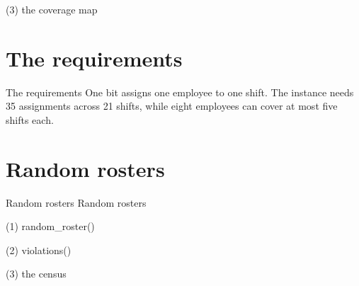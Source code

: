 \begin{frame}[fragile]{(3) the coverage map}

\end{frame}


\section{The requirements}

\begin{frame}{The requirements}
One bit assigns one employee to one shift. The instance needs 35 assignments
across 21 shifts, while eight employees can cover at most five shifts each.
\end{frame}


\section{Random rosters}

\begin{frame}{Random rosters}
Random rosters
\end{frame}

\begin{frame}[fragile]{(1) random\_roster()}

\end{frame}

\begin{frame}[fragile]{(2) violations()}

\end{frame}

\begin{frame}[fragile]{(3) the census}

\end{frame}

